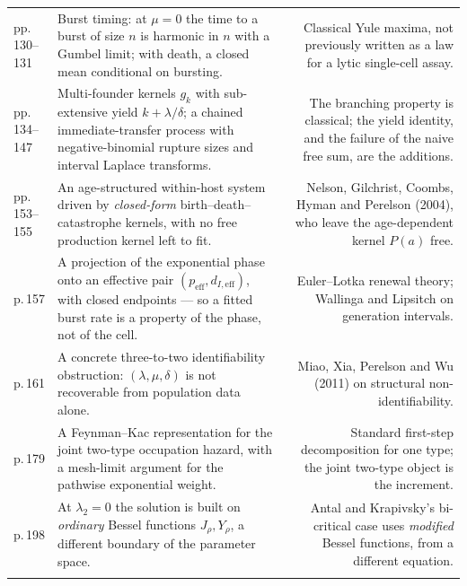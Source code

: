 {\begin{xltabular}{\linewidth}{@{}WZN@{}}
\newline pp.\,130--131 &
Burst timing: at $\mu=0$ the time to a burst of size $n$ is harmonic in $n$ with a Gumbel
limit; with death, a closed mean conditional on bursting. &
Classical Yule maxima, not previously written as a law for a lytic single-cell assay. \\
\addlinespace[3pt]

\newline pp.\,134--147 &
Multi-founder kernels $g_k$ with sub-extensive yield $k+\lambda/\delta$; a chained
immediate-transfer process with negative-binomial rupture sizes and interval Laplace
transforms. &
The branching property is classical; the yield identity, and the failure of the naive free
sum, are the additions. \\
\addlinespace[3pt]

\newline pp.\,153--155 &
An age-structured within-host system driven by \emph{closed-form} birth--death--catastrophe
kernels, with no free production kernel left to fit. &
Nelson, Gilchrist, Coombs, Hyman and Perelson (2004), who leave the age-dependent kernel
$P(a)$ free. \\
\addlinespace[3pt]

\newline p.\,157 &
A projection of the exponential phase onto an effective pair
$(p_{\mathrm{eff}},d_{I,\mathrm{eff}})$, with closed endpoints --- so a fitted burst rate
is a property of the phase, not of the cell. &
Euler--Lotka renewal theory; Wallinga and Lipsitch on generation intervals. \\
\addlinespace[3pt]

\newline p.\,161 &
A concrete three-to-two identifiability obstruction: $(\lambda,\mu,\delta)$ is not
recoverable from population data alone. &
Miao, Xia, Perelson and Wu (2011) on structural non-identifiability. \\
\addlinespace[3pt]

\newline p.\,179 &
A Feynman--Kac representation for the joint two-type occupation hazard, with a mesh-limit
argument for the pathwise exponential weight. &
Standard first-step decomposition for one type; the joint two-type object is the increment. \\
\addlinespace[3pt]

\newline p.\,198 &
At $\lambda_2=0$ the solution is built on \emph{ordinary} Bessel functions
$J_\rho,Y_\rho$, a different boundary of the parameter space. &
Antal and Krapivsky's bi-critical case uses \emph{modified} Bessel functions, from a
different equation. \\
\addlinespace[3pt]


\end{xltabular}}
